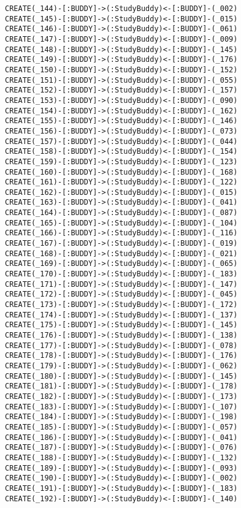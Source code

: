\begin{lstlisting}
CREATE(_144)-[:BUDDY]->(:StudyBuddy)<-[:BUDDY]-(_002)
CREATE(_145)-[:BUDDY]->(:StudyBuddy)<-[:BUDDY]-(_015)
CREATE(_146)-[:BUDDY]->(:StudyBuddy)<-[:BUDDY]-(_061)
CREATE(_147)-[:BUDDY]->(:StudyBuddy)<-[:BUDDY]-(_009)
CREATE(_148)-[:BUDDY]->(:StudyBuddy)<-[:BUDDY]-(_145)
CREATE(_149)-[:BUDDY]->(:StudyBuddy)<-[:BUDDY]-(_176)
CREATE(_150)-[:BUDDY]->(:StudyBuddy)<-[:BUDDY]-(_152)
CREATE(_151)-[:BUDDY]->(:StudyBuddy)<-[:BUDDY]-(_055)
CREATE(_152)-[:BUDDY]->(:StudyBuddy)<-[:BUDDY]-(_157)
CREATE(_153)-[:BUDDY]->(:StudyBuddy)<-[:BUDDY]-(_090)
CREATE(_154)-[:BUDDY]->(:StudyBuddy)<-[:BUDDY]-(_162)
CREATE(_155)-[:BUDDY]->(:StudyBuddy)<-[:BUDDY]-(_146)
CREATE(_156)-[:BUDDY]->(:StudyBuddy)<-[:BUDDY]-(_073)
CREATE(_157)-[:BUDDY]->(:StudyBuddy)<-[:BUDDY]-(_044)
CREATE(_158)-[:BUDDY]->(:StudyBuddy)<-[:BUDDY]-(_154)
CREATE(_159)-[:BUDDY]->(:StudyBuddy)<-[:BUDDY]-(_123)
CREATE(_160)-[:BUDDY]->(:StudyBuddy)<-[:BUDDY]-(_168)
CREATE(_161)-[:BUDDY]->(:StudyBuddy)<-[:BUDDY]-(_122)
CREATE(_162)-[:BUDDY]->(:StudyBuddy)<-[:BUDDY]-(_015)
CREATE(_163)-[:BUDDY]->(:StudyBuddy)<-[:BUDDY]-(_041)
CREATE(_164)-[:BUDDY]->(:StudyBuddy)<-[:BUDDY]-(_087)
CREATE(_165)-[:BUDDY]->(:StudyBuddy)<-[:BUDDY]-(_104)
CREATE(_166)-[:BUDDY]->(:StudyBuddy)<-[:BUDDY]-(_116)
CREATE(_167)-[:BUDDY]->(:StudyBuddy)<-[:BUDDY]-(_019)
CREATE(_168)-[:BUDDY]->(:StudyBuddy)<-[:BUDDY]-(_021)
CREATE(_169)-[:BUDDY]->(:StudyBuddy)<-[:BUDDY]-(_065)
CREATE(_170)-[:BUDDY]->(:StudyBuddy)<-[:BUDDY]-(_183)
CREATE(_171)-[:BUDDY]->(:StudyBuddy)<-[:BUDDY]-(_147)
CREATE(_172)-[:BUDDY]->(:StudyBuddy)<-[:BUDDY]-(_045)
CREATE(_173)-[:BUDDY]->(:StudyBuddy)<-[:BUDDY]-(_172)
CREATE(_174)-[:BUDDY]->(:StudyBuddy)<-[:BUDDY]-(_137)
CREATE(_175)-[:BUDDY]->(:StudyBuddy)<-[:BUDDY]-(_145)
CREATE(_176)-[:BUDDY]->(:StudyBuddy)<-[:BUDDY]-(_138)
CREATE(_177)-[:BUDDY]->(:StudyBuddy)<-[:BUDDY]-(_078)
CREATE(_178)-[:BUDDY]->(:StudyBuddy)<-[:BUDDY]-(_176)
CREATE(_179)-[:BUDDY]->(:StudyBuddy)<-[:BUDDY]-(_062)
CREATE(_180)-[:BUDDY]->(:StudyBuddy)<-[:BUDDY]-(_145)
CREATE(_181)-[:BUDDY]->(:StudyBuddy)<-[:BUDDY]-(_178)
CREATE(_182)-[:BUDDY]->(:StudyBuddy)<-[:BUDDY]-(_173)
CREATE(_183)-[:BUDDY]->(:StudyBuddy)<-[:BUDDY]-(_107)
CREATE(_184)-[:BUDDY]->(:StudyBuddy)<-[:BUDDY]-(_198)
CREATE(_185)-[:BUDDY]->(:StudyBuddy)<-[:BUDDY]-(_057)
CREATE(_186)-[:BUDDY]->(:StudyBuddy)<-[:BUDDY]-(_041)
CREATE(_187)-[:BUDDY]->(:StudyBuddy)<-[:BUDDY]-(_076)
CREATE(_188)-[:BUDDY]->(:StudyBuddy)<-[:BUDDY]-(_132)
CREATE(_189)-[:BUDDY]->(:StudyBuddy)<-[:BUDDY]-(_093)
CREATE(_190)-[:BUDDY]->(:StudyBuddy)<-[:BUDDY]-(_002)
CREATE(_191)-[:BUDDY]->(:StudyBuddy)<-[:BUDDY]-(_183)
CREATE(_192)-[:BUDDY]->(:StudyBuddy)<-[:BUDDY]-(_140)

\end{lstlisting}

